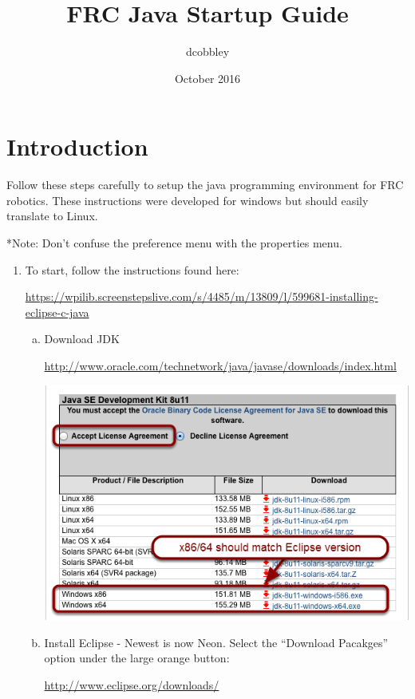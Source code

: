 \documentclass{article}
\title{FRC Java Startup Guide}
\author{dcobbley }
\date{October 2016}
\begin{document}
\maketitle

\section{Introduction}
Follow these steps carefully to setup the java programming environment for FRC robotics. These instructions were developed for windows but should easily translate to Linux.

*Note: Don’t confuse the preference menu with the properties menu.

\begin{enumerate}
    \item To start, follow the instructions found here:
    
    \url{https://wpilib.screenstepslive.com/s/4485/m/13809/l/599681-installing-eclipse-c-java}
    \begin{enumerate}[(a)]
        \item Download JDK
        
        \url{http://www.oracle.com/technetwork/java/javase/downloads/index.html}

    
    \href{http://www.oracle.com/technetwork/java/javase/downloads/index.html}{\includegraphics[scale=.5]{1a.png}}
    
    
        \item Install Eclipse - Newest is now Neon. Select the “Download Pacakges” option under the large orange button:
        
        \url{http://www.eclipse.org/downloads/}
        

\end{enumerate}
\end{enumerate}
\end{document}
